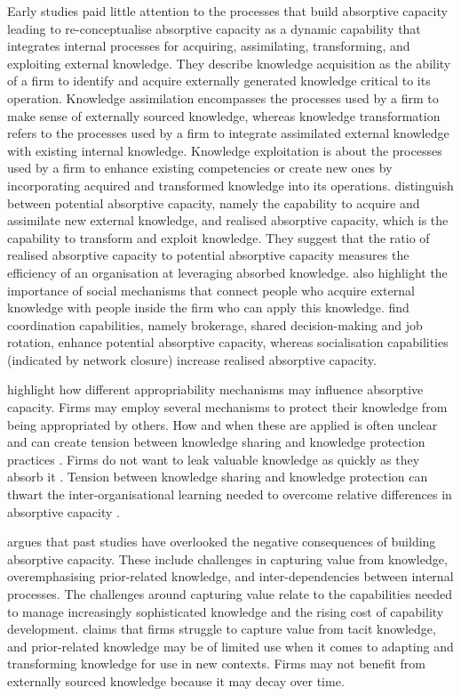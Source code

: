 Early studies paid little attention to the processes that build absorptive capacity leading \citet{zahra2002absorptive} to re-conceptualise absorptive capacity as a dynamic capability that integrates internal processes for acquiring, assimilating, transforming, and exploiting external knowledge. They describe knowledge acquisition as the ability of a firm to identify and acquire externally generated knowledge critical to its operation. Knowledge assimilation encompasses the processes used by a firm to make sense of externally sourced knowledge, whereas knowledge transformation refers to the processes used by a firm to integrate assimilated external knowledge with existing internal knowledge. Knowledge exploitation is about the processes used by a firm to enhance existing competencies or create new ones by incorporating acquired and transformed knowledge into its operations. \citet{zahra2002absorptive} distinguish between potential absorptive capacity, namely the capability to acquire and assimilate new external knowledge, and realised absorptive capacity, which is the capability to transform and exploit knowledge. They suggest that the ratio of realised absorptive capacity to potential absorptive capacity measures the efficiency of an organisation at leveraging absorbed knowledge. \citet{zahra2002absorptive} also highlight the importance of social mechanisms that connect people who acquire external knowledge with people inside the firm who can apply this knowledge. \citet{jansen2005managing} find coordination capabilities, namely brokerage, shared decision-making and job rotation, enhance potential absorptive capacity, whereas socialisation capabilities (indicated by network closure) increase realised absorptive capacity. \medskip

\citet{todorova2007absorptive} highlight how different appropriability mechanisms may influence absorptive capacity. Firms may employ several mechanisms to protect their knowledge from being appropriated by others. How and when these are applied is often unclear and can create tension between knowledge sharing and knowledge protection practices \citep{gama2019managing}. Firms do not want to leak valuable knowledge as quickly as they absorb it \citep{todorova2007absorptive}. Tension between knowledge sharing and knowledge protection can thwart the inter-organisational learning needed to overcome relative differences in absorptive capacity \citep{dragsdahl2019perspective,gama2019managing}. \medskip

\citet {lichtenthaler2016absorptive} argues that past studies have overlooked the negative consequences of building absorptive capacity. These include challenges in capturing value from knowledge, overemphasising prior-related knowledge, and inter-dependencies between internal processes. The challenges around capturing value relate to the capabilities needed to manage increasingly sophisticated knowledge and the rising cost of capability development. \citet{lichtenthaler2016absorptive} claims that firms struggle to capture value from tacit knowledge, and prior-related knowledge may be of limited use when it comes to adapting and transforming knowledge for use in new contexts. Firms may not benefit from externally sourced knowledge because it may decay over time. \medskip

